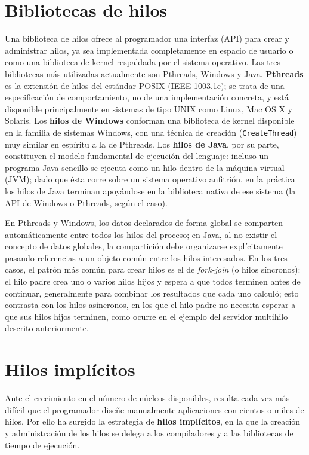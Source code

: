\documentclass[12pt,letterpaper]{article}
\begin{document}
\section{Bibliotecas de hilos}

Una biblioteca de hilos ofrece al programador una interfaz (API) para crear y administrar hilos, ya sea implementada completamente en espacio de usuario o como una biblioteca de kernel respaldada por el sistema operativo. Las tres bibliotecas más utilizadas actualmente son Pthreads, Windows y Java. \textbf{Pthreads} es la extensión de hilos del estándar POSIX (IEEE 1003.1c); se trata de una especificación de comportamiento, no de una implementación concreta, y está disponible principalmente en sistemas de tipo UNIX como Linux, Mac OS X y Solaris. Los \textbf{hilos de Windows} conforman una biblioteca de kernel disponible en la familia de sistemas Windows, con una técnica de creación (\texttt{CreateThread}) muy similar en espíritu a la de Pthreads. Los \textbf{hilos de Java}, por su parte, constituyen el modelo fundamental de ejecución del lenguaje: incluso un programa Java sencillo se ejecuta como un hilo dentro de la máquina virtual (JVM); dado que ésta corre sobre un sistema operativo anfitrión, en la práctica los hilos de Java terminan apoyándose en la biblioteca nativa de ese sistema (la API de Windows o Pthreads, según el caso).

En Pthreads y Windows, los datos declarados de forma global se comparten automáticamente entre todos los hilos del proceso; en Java, al no existir el concepto de datos globales, la compartición debe organizarse explícitamente pasando referencias a un objeto común entre los hilos interesados. En los tres casos, el patrón más común para crear hilos es el de \textit{fork-join} (o hilos síncronos): el hilo padre crea uno o varios hilos hijos y espera a que todos terminen antes de continuar, generalmente para combinar los resultados que cada uno calculó; esto contrasta con los hilos asíncronos, en los que el hilo padre no necesita esperar a que sus hilos hijos terminen, como ocurre en el ejemplo del servidor multihilo descrito anteriormente.

\section{Hilos implícitos}

Ante el crecimiento en el número de núcleos disponibles, resulta cada vez más difícil que el programador diseñe manualmente aplicaciones con cientos o miles de hilos. Por ello ha surgido la estrategia de \textbf{hilos implícitos}, en la que la creación y administración de los hilos se delega a los compiladores y a las bibliotecas de tiempo de ejecución.
\end{document}
